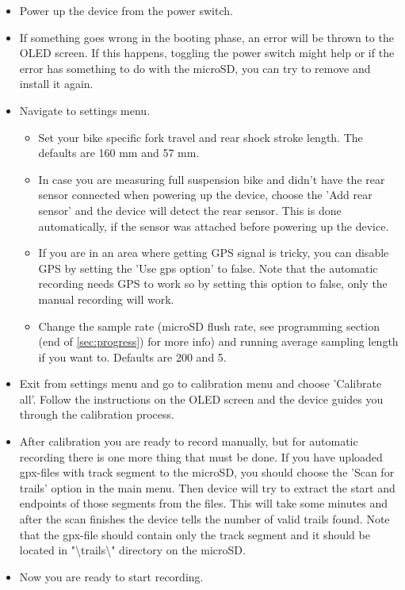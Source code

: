 \documentclass[a4paper,11pt]{article}
\begin{document}
\begin{itemize}
    \item Power up the device from the power switch.

    \item If something goes wrong in the booting phase, an error will be thrown to the OLED screen. If this happens, toggling the power switch might help or if the error has something to do with the microSD, you can try to remove and install it again.

    \item Navigate to settings menu. 
        \begin{itemize}
            \item Set your bike specific fork travel and rear shock stroke length. The defaults are 160 mm and 57 mm.
            \item In case you are measuring full suspension bike and didn't have the rear sensor connected when powering up the device, choose the 'Add rear sensor' and the device will detect the rear sensor. This is done automatically, if the sensor was attached before powering up the device.
            \item If you are in an area where getting GPS signal is tricky, you can disable GPS by setting the 'Use gps option' to false. Note that the automatic recording needs GPS to work so by setting this option to false, only the manual recording will work.
            \item Change the sample rate (microSD flush rate, see programming section (end of \ref{sec:progress}) for more info) and running average sampling length if you want to. Defaults are 200 and 5.
        \end{itemize}

        \item Exit from settings menu and go to calibration menu and choose 'Calibrate all'.  Follow the instructions on the OLED screen and the device guides you through the calibration process.

        \item After calibration you are ready to record manually, but for automatic recording there is one more thing that must be done. If you have uploaded gpx-files with track segment to the microSD, you should choose the 'Scan for trails' option in the main menu. Then device will try to extract the start and endpoints of those segments from the files. This will take some minutes and after the scan finishes the device tells the number of valid trails found. Note that the gpx-file should contain only the track segment and it should be located in "\textbackslash trails\textbackslash" directory on the microSD.

        \item Now you are ready to start recording.
\end{itemize}
\end{document}
